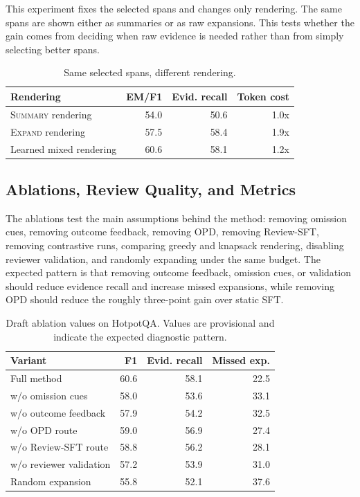 \documentclass[11pt]{article}
\newcommand{\expandact}{\textsc{Expand}}
\newcommand{\summaryact}{\textsc{Summary}}
\begin{document}
This experiment fixes the selected spans and changes only rendering. The same spans are shown either as summaries or as raw expansions. This tests whether the gain comes from deciding when raw evidence is needed rather than from simply selecting better spans.

\begin{table}[t]
\centering
\small
\begin{tabular}{lrrr}
\toprule
Rendering & EM/F1 & Evid. recall & Token cost \\
\midrule
\summaryact{} rendering & 54.0 & 50.6 & 1.0x \\
\expandact{} rendering & 57.5 & 58.4 & 1.9x \\
Learned mixed rendering & 60.6 & 58.1 & 1.2x \\
\bottomrule
\end{tabular}
\caption{Same selected spans, different rendering.}
\label{tab:killer2}
\end{table}

\subsection{Ablations, Review Quality, and Metrics}

The ablations test the main assumptions behind the method: removing omission cues, removing outcome feedback, removing OPD, removing Review-SFT, removing contrastive runs, comparing greedy and knapsack rendering, disabling reviewer validation, and randomly expanding under the same budget. The expected pattern is that removing outcome feedback, omission cues, or validation should reduce evidence recall and increase missed expansions, while removing OPD should reduce the roughly three-point gain over static SFT.

\begin{table}[t]
\centering
\small
\begin{tabular}{lrrr}
\toprule
Variant & F1 & Evid. recall & Missed exp. \\
\midrule
Full method & 60.6 & 58.1 & 22.5 \\
w/o omission cues & 58.0 & 53.6 & 33.1 \\
w/o outcome feedback & 57.9 & 54.2 & 32.5 \\
w/o OPD route & 59.0 & 56.9 & 27.4 \\
w/o Review-SFT route & 58.8 & 56.2 & 28.1 \\
w/o reviewer validation & 57.2 & 53.9 & 31.0 \\
Random expansion & 55.8 & 52.1 & 37.6 \\
\bottomrule
\end{tabular}
\caption{Draft ablation values on HotpotQA. Values are provisional and indicate the expected diagnostic pattern.}
\label{tab:ablations}
\end{table}
\end{document}
